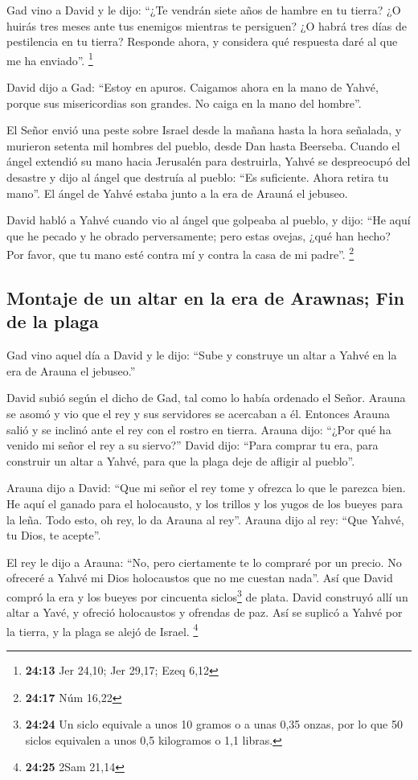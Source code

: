  Gad vino a David y le dijo: ``¿Te vendrán siete años de
hambre en tu tierra? ¿O huirás tres meses ante tus enemigos mientras te
persiguen? ¿O habrá tres días de pestilencia en tu tierra? Responde
ahora, y considera qué respuesta daré al que me ha enviado''.
\footnote{\textbf{24:13} Jer 24,10; Jer 29,17; Ezeq 6,12}

 David dijo a Gad: ``Estoy en apuros. Caigamos ahora en
la mano de Yahvé, porque sus misericordias son grandes. No caiga en la
mano del hombre''.

 El Señor envió una peste sobre Israel desde la mañana
hasta la hora señalada, y murieron setenta mil hombres del pueblo, desde
Dan hasta Beerseba.  Cuando el ángel extendió su mano
hacia Jerusalén para destruirla, Yahvé se despreocupó del desastre y
dijo al ángel que destruía al pueblo: ``Es suficiente. Ahora retira tu
mano''. El ángel de Yahvé estaba junto a la era de Arauná el jebuseo.

 David habló a Yahvé cuando vio al ángel que golpeaba al
pueblo, y dijo: ``He aquí que he pecado y he obrado perversamente; pero
estas ovejas, ¿qué han hecho? Por favor, que tu mano esté contra mí y
contra la casa de mi padre''. \footnote{\textbf{24:17} Núm 16,22}

\hypertarget{montaje-de-un-altar-en-la-era-de-arawnas-fin-de-la-plaga}{%
\subsection{Montaje de un altar en la era de Arawnas; Fin de la
plaga}\label{montaje-de-un-altar-en-la-era-de-arawnas-fin-de-la-plaga}}

 Gad vino aquel día a David y le dijo: ``Sube y construye
un altar a Yahvé en la era de Arauna el jebuseo.''

 David subió según el dicho de Gad, tal como lo había
ordenado el Señor.  Arauna se asomó y vio que el rey y
sus servidores se acercaban a él. Entonces Arauna salió y se inclinó
ante el rey con el rostro en tierra.  Arauna dijo: ``¿Por
qué ha venido mi señor el rey a su siervo?'' David dijo: ``Para comprar
tu era, para construir un altar a Yahvé, para que la plaga deje de
afligir al pueblo''.

 Arauna dijo a David: ``Que mi señor el rey tome y
ofrezca lo que le parezca bien. He aquí el ganado para el holocausto, y
los trillos y los yugos de los bueyes para la leña.  Todo
esto, oh rey, lo da Arauna al rey''. Arauna dijo al rey: ``Que Yahvé, tu
Dios, te acepte''.

 El rey le dijo a Arauna: ``No, pero ciertamente te lo
compraré por un precio. No ofreceré a Yahvé mi Dios holocaustos que no
me cuestan nada''. Así que David compró la era y los bueyes por
cincuenta siclos\footnote{\textbf{24:24} Un siclo equivale a unos 10
  gramos o a unas 0,35 onzas, por lo que 50 siclos equivalen a unos 0,5
  kilogramos o 1,1 libras.} de plata.  David construyó
allí un altar a Yavé, y ofreció holocaustos y ofrendas de paz. Así se
suplicó a Yahvé por la tierra, y la plaga se alejó de Israel.
\footnote{\textbf{24:25} 2Sam 21,14}
